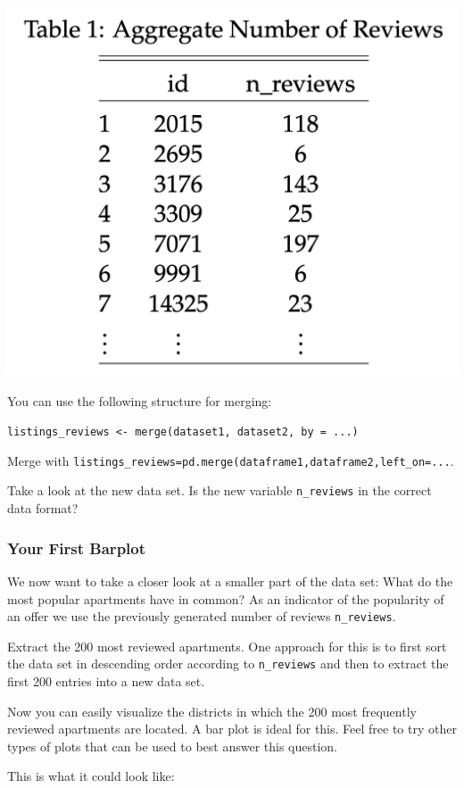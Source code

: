 \documentclass[
  11pt,
]{article}
\newenvironment{tips}[1]
  {
  \begin{itemize}
  \footnotesize
  \renewcommand{\labelitemi}{
    \raisebox{-.7\height}[0pt][0pt]{
      {\setkeys{Gin}{width=3em,keepaspectratio}
        \texttt{[image: images/\#1.png]}}
    }
  }
  \setlength{\fboxsep}{1em}
  \begin{rbox}
  \item
  }
  {
  \end{rbox}
  \end{itemize}
  }
\newenvironment{tipsp}[1]
  {
  \begin{itemize}
  \footnotesize
  \renewcommand{\labelitemi}{
    \raisebox{-.7\height}[0pt][0pt]{
      {\setkeys{Gin}{width=3em,keepaspectratio}
        \texttt{[image: images/\#1.png]}}
    }
  }
  \setlength{\fboxsep}{1em}
  \begin{pbox}
  \item
  }
  {
  \end{pbox}
  \end{itemize}
  }
\begin{document}
\begin{center}\includegraphics[width=0.4\linewidth]{plot/2_merging_table} \end{center}

\begin{tips}r
You can use the following structure for merging:

\texttt{listings\_reviews\ \textless{}-\ merge(dataset1,\ dataset2,\ by\ =\ ...)}

\end{tips}

\begin{tipsp}p
Merge with \texttt{listings\_reviews=pd.merge(dataframe1,dataframe2,left\_on=...}.

\end{tipsp}

Take a look at the new data set. Is the new variable \texttt{n\_reviews} in the correct data format?

\hypertarget{your-first-barplot}{%
\subsubsection{Your First Barplot}\label{your-first-barplot}}

We now want to take a closer look at a smaller part of the data set: What do the most popular apartments have in common? As an indicator of the popularity of an offer we use the previously generated number of reviews \texttt{n\_reviews}.

Extract the 200 most reviewed apartments. One approach for this is to first sort the data set in descending order according to \texttt{n\_reviews} and then to extract the first 200 entries into a new data set.

Now you can easily visualize the districts in which the 200 most frequently reviewed apartments are located. A bar plot is ideal for this. Feel free to try other types of plots that can be used to best answer this question.

This is what it could look like:
\end{document}
